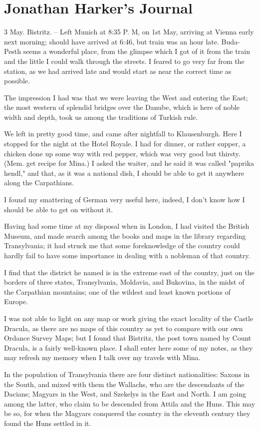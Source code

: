 \chapter{Jonathan Harker's Journal}
3 May. Bistritz. -- Left Munich at 8:35 P. M, on 1st May, arriving at Vienna early next morning; should have arrived at 6:46, but train was an hour late. Buda-Pesth seems a wonderful place, from the glimpse which I got of it from the train and the little I could walk through the streets. I feared to go very far from the station, as we had arrived late and would start as near the correct time as possible.

The impression I had was that we were leaving the West and entering the East; the most western of splendid bridges over the Danube, which is here of noble width and depth, took us among the traditions of Turkish rule.

We left in pretty good time, and came after nightfall to Klausenburgh. Here I stopped for the night at the Hotel Royale. I had for dinner, or rather supper, a chicken done up some way with red pepper, which was very good but thirsty. (Mem. get recipe for Mina.) I asked the waiter, and he said it was called "paprika hendl," and that, as it was a national dish, I should be able to get it anywhere along the Carpathians.

I found my smattering of German very useful here, indeed, I don't know how I should be able to get on without it.

Having had some time at my disposal when in London, I had visited the British Museum, and made search among the books and maps in the library regarding Transylvania; it had struck me that some foreknowledge of the country could hardly fail to have some importance in dealing with a nobleman of that country.

I find that the district he named is in the extreme east of the country, just on the borders of three states, Transylvania, Moldavia, and Bukovina, in the midst of the Carpathian mountains; one of the wildest and least known portions of Europe.

I was not able to light on any map or work giving the exact locality of the Castle Dracula, as there are no maps of this country as yet to compare with our own Ordance Survey Maps; but I found that Bistritz, the post town named by Count Dracula, is a fairly well-known place. I shall enter here some of my notes, as they may refresh my memory when I talk over my travels with Mina.

In the population of Transylvania there are four distinct nationalities: Saxons in the South, and mixed with them the Wallachs, who are the descendants of the Dacians; Magyars in the West, and Szekelys in the East and North. I am going among the latter, who claim to be descended from Attila and the Huns. This may be so, for when the Magyars conquered the country in the eleventh century they found the Huns settled in it.


